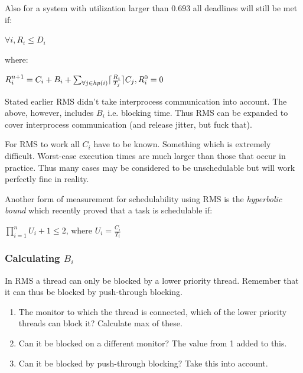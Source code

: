 \documentclass[a4paper]{article}
\DeclarePairedDelimiter{\ceil}{\lceil}{\rceil}
\begin{document}
Also for a system with utilization larger than $0.693$ all deadlines will still
be met if:

\begin{center}
  $\forall i, R_i \leq D_i$
\end{center}
where:
\begin{center}
  $R_i^{n+1} = C_i + B_i + \sum_{\forall j \in hp(i)} \ceil{\frac{R_i}{T_j}} C_j, R_i^0 = 0$
\end{center}

Stated earlier RMS didn't take interprocess communication into account. The above,
however, includes $B_i$ i.e. blocking time. Thus RMS can be expanded to cover
interprocess communication (and release jitter, but fuck that).

For RMS to work all $C_i$ have to be known. Something which is extremely difficult.
Worst-case execution times are much larger than those that occur in practice.
Thus many cases may be considered to be unschedulable but will work perfectly fine
in reality.

Another form of measurement for schedulability using RMS is the \emph{hyperbolic bound}
which recently proved that a task is schedulable if:

\begin{center}
  $\prod_{i=1}^{n} U_i + 1 \leq 2$, where $U_i = \frac{C_i}{T_i}$
\end{center}


\subsubsection{Calculating $B_i$}
In RMS a thread can only be blocked by a lower priority thread. Remember that
it can thus be blocked by push-through blocking.

\begin{enumerate}
  \item The monitor to which the thread is connected, which of the lower
        priority threads can block it? Calculate max of these.
  \item Can it be blocked on a different monitor? The value from 1 added to this.
  \item Can it be blocked by push-through blocking? Take this into account.
\end{enumerate}
\end{document}
